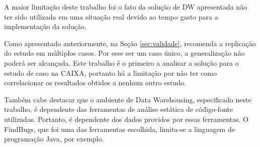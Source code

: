 A maior limitação deste trabalho foi o fato da solução de DW apresentada não ter sido utilizada em uma situação real devido ao tempo gasto para a implementação da solução. 

Como apresentado anteriormente, na Seção \ref{sec:validade},  recomenda a replicação do estudo em múltiplos casos. Por esse ser um caso único, a generalização não poderá ser alcançada. Este trabalho é o primeiro a analisar a solução para o estudo de caso na CAIXA, portanto há a limitação por não  ter como correlacionar os resultados obtidos a nenhum outro estudo.

Também cabe destacar que o ambiente de Data Warehousing, especificado neste trabalho, é dependente das ferramentas de análise estática de código-fonte utilizadas. Portanto, é dependente dos dados providos por essas ferramentas. O FindBugs, que foi uma das ferramentas escolhida, limita-se a linguagem de programação Java, por exemplo.




